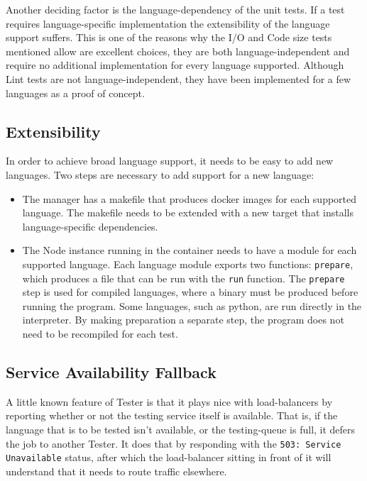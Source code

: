 Another deciding factor is the language-dependency of the unit tests. If a test requires language-specific implementation the extensibility of the language support suffers. This is one of the reasons why the I/O and Code size tests mentioned allow are excellent choices, they are both language-independent and require no additional implementation for every language supported. Although Lint tests are not language-independent, they have been implemented for a few languages as a proof of concept.

\subsection{Extensibility}
In order to achieve broad language support, it needs to be easy to add new languages. Two steps are necessary to add support for a new language:

\begin{itemize}
\item The manager has a makefile that produces docker images for each supported language. The makefile needs to be extended with a new target that installs language-specific dependencies.

\item The Node instance running in the container needs to have a module for each supported language. Each language module exports two functions: \texttt{prepare}, which produces a file that can be run with the \texttt{run} function. The \texttt{prepare} step is used for compiled languages, where a binary must be produced before running the program. Some languages, such as python, are run directly in the interpreter. By making preparation a separate step, the program does not need to be recompiled for each test.
\end{itemize}

\subsection{Service Availability Fallback}
A little known feature of Tester is that it plays nice with load-balancers by reporting whether or not the testing service itself is available. That is, if the language that is to be tested isn't available, or the testing-queue is full, it defers the job to another Tester. It does that by responding with the \texttt{503: Service Unavailable} status, after which the load-balancer sitting in front of it will understand that it needs to route traffic elsewhere.
